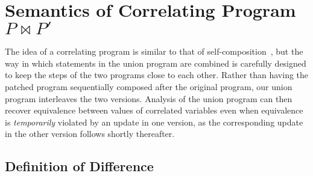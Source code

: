 \section{Semantics of Correlating Program $P \bowtie P'$} 

The idea of a correlating program is similar to that of
self-composition~\cite{BartheDArgenioRezk04,AikenTerauchi05}, but the way in
which statements in the union program are combined is carefully designed to
keep the steps of the two programs close to each other. Rather than having
the patched program sequentially composed after the original program, our
union program interleaves the two versions. Analysis of the union program can
then recover equivalence between values of correlated variables even when
equivalence is \emph{temporarily} violated by an update in one version, as
the corresponding update in the other version follows shortly thereafter.




\subsection{Definition of Difference} 


